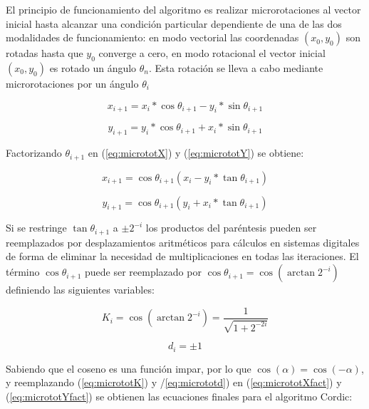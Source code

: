 El principio de funcionamiento del algoritmo es realizar microrotaciones al vector inicial hasta
alcanzar una condición particular dependiente de una de las dos modalidades de funcionamiento: en
modo vectorial las coordenadas $(x_0,y_0)$ son rotadas hasta que $y_0$ converge a cero, en modo
rotacional el vector inicial $(x_0,y_0)$ es rotado un ángulo
$\theta_n$.
Esta rotación se lleva a cabo mediante microrotaciones por un ángulo $\theta_i$

\begin{equation}
x_{i+1} = x_i* \cos \theta_{i+1} - y_i* \sin \theta_{i+1}
\label{eq:micrototX}
\end{equation}

\begin{equation}
y_{i+1} = y_i* \cos \theta_{i+1} + x_i* \sin \theta_{i+1}
\label{eq:micrototY}
\end{equation}

Factorizando $\theta_{i+1}$ en (\ref{eq:micrototX}) y (\ref{eq:micrototY}) se obtiene:

\begin{equation}
x_{i+1} = \cos \theta_{i+1} (x_i - y_i* \tan \theta_{i+1})
\label{eq:micrototXfact}
\end{equation}

\begin{equation}
y_{i+1} = \cos \theta_{i+1} (y_i + x_i* \tan \theta_{i+1})
\label{eq:micrototYfact}
\end{equation}

Si se restringe $\tan \theta_{i+1}$ a $\pm 2^{-i}$ los productos del paréntesis pueden ser
reemplazados por desplazamientos aritméticos para cálculos en sistemas digitales de forma de
eliminar la necesidad de multiplicaciones en todas las iteraciones. El término $\cos \theta_{i+1}$
puede ser reemplazado por $\cos \theta_{i+1} = \cos (\arctan 2^{-i})$ definiendo las siguientes
variables:

\begin{equation}
K_i = \cos (\arctan 2^{-i}) = \frac{1}{\sqrt{1+2^{-2i}}}
\label{eq:micrototK}
\end{equation}

\begin{equation}
d_i = \pm 1
\label{eq:micrototd}
\end{equation}

Sabiendo que el coseno es una función impar, por lo que $\cos (\alpha) = \cos (-\alpha)$, y
reemplazando (\ref{eq:micrototK}) y /\ref{eq:micrototd}) en (\ref{eq:micrototXfact}) y
(\ref{eq:micrototYfact}) se obtienen las ecuaciones finales para el algoritmo Cordic:

